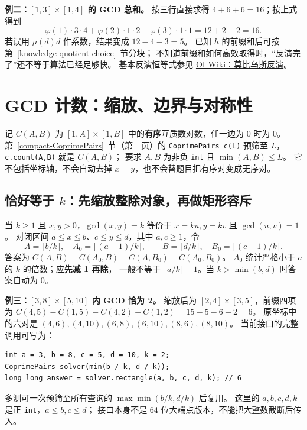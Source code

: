 \textbf{例二：$[1,3]\times[1,4]$ 的 GCD 总和。}
按三行直接求得 $4+6+6=16$；按上式得到
\[
\varphi(1)\cdot3\cdot4+\varphi(2)\cdot1\cdot2
+\varphi(3)\cdot1\cdot1=12+2+2=16.
\]
若误用 $\mu(d)d$ 作系数，结果变成 $12-4-3=5$。
已知 $h$ 的前缀和后可按第~\ref{knowledge-quotient-choice}~节分块；
不知道前缀和如何高效取得时，“反演完了”还不等于算法已经足够快。
基本反演恒等式参见
\href{https://oi-wiki.org/math/number-theory/mobius/}{OI Wiki：莫比乌斯反演}。

\section{GCD 计数：缩放、边界与对称性}\label{knowledge-gcd-domains}
记 $C(A,B)$ 为 $[1,A]\times[1,B]$ 中的\textbf{有序}互质数对数，任一边为 0 时为 0。
第~\ref{compact-CoprimePairs}~节（第~\pageref{compact-CoprimePairs}~页）的
\texttt{CoprimePairs c(L)} 预筛至 $L$，\texttt{c.count(A,B)} 就是 $C(A,B)$；
要求 $A,B$ 为非负 \texttt{int} 且 $\min(A,B)\le L$。
它不包括坐标轴，不会自动去掉 $x=y$，也不会替题目把有序对变成无序对。

\subsection{恰好等于 \texorpdfstring{$k$}{k}：先缩放整除对象，再做矩形容斥}
当 $k\ge1$ 且 $x,y>0$，$\gcd(x,y)=k$ 等价于
$x=ku,y=kv$ 且 $\gcd(u,v)=1$。
对闭区间 $a\le x\le b$、$c\le y\le d$，其中 $a,c\ge1$，令
\[
A=\lfloor b/k\rfloor,\quad A_0=\lfloor(a-1)/k\rfloor,\qquad
B=\lfloor d/k\rfloor,\quad B_0=\lfloor(c-1)/k\rfloor.
\]
答案为 $C(A,B)-C(A_0,B)-C(A,B_0)+C(A_0,B_0)$。
$A_0$ 统计严格小于 $a$ 的 $k$ 的倍数；应\textbf{先减 1 再除}，
一般不等于 $\lfloor a/k\rfloor-1$。当 $k>\min(b,d)$ 时答案自动为 0。

\textbf{例三：$[3,8]\times[5,10]$ 内 GCD 恰为 2。}
缩放后为 $[2,4]\times[3,5]$，前缀四项为
$C(4,5)-C(1,5)-C(4,2)+C(1,2)=15-5-6+2=6$。
原坐标中的六对是 $(4,6),(4,10),(6,8),(6,10),(8,6),(8,10)$。
当前接口的完整调用可写为：
\begin{lstlisting}
int a = 3, b = 8, c = 5, d = 10, k = 2;
CoprimePairs solver(min(b / k, d / k));
long long answer = solver.rectangle(a, b, c, d, k); // 6
\end{lstlisting}
多测可一次预筛至所有查询的 $\max\min(b/k,d/k)$ 后复用。
这里的 $a,b,c,d,k$ 是正 \texttt{int}，$a\le b,c\le d$；
接口本身不是 64 位大端点版本，不能把大整数截断后传入。

